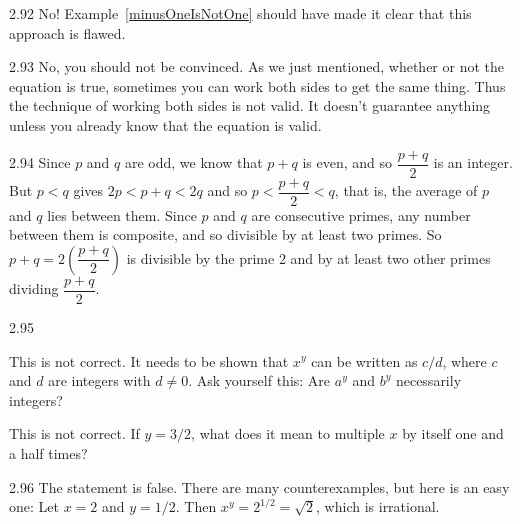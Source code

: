 \begin{Answer}{2.92}
No!  Example~\ref{minusOneIsNotOne} should have made it clear that this approach is flawed.
\end{Answer}
\begin{Answer}{2.93}
No, you should not be convinced.
As we just mentioned, whether or not the equation is true, sometimes you can work both
sides to get the same thing.  Thus the technique of working both sides is not valid.
It doesn't guarantee anything unless you already know that the equation is valid.
\end{Answer}
\begin{Answer}{2.94}
Since $p$ and $q$ are odd, we know that $p+q$ is even, and so
$\dfrac{p+q}{2}$ is an integer. But $p< q$ gives $2p < p+q < 2q $
and so $p < \dfrac{p+q}{2} < q$, that is, the average of $p$ and $q$
lies between them. Since $p$ and $q$ are consecutive primes, any
number between them is composite, and so divisible by at least two
primes. So $p+q = 2\left(\dfrac{p+q}{2}\right)$ is divisible by the
prime $2$ and by at least two other primes dividing
$\dfrac{p+q}{2}$.
\end{Answer}
\begin{Answer}{2.95}
\begin{pfevalenum}
\item
This is not correct.  It needs to be shown that $x^y$ can be written as $c/d$, where $c$ and $d$ are
integers with $d\neq 0$.  Ask yourself this:  Are $a^y$ and $b^y$ necessarily integers?
\item
This is not correct.  If $y=3/2$, what does it mean to multiple $x$ by itself one and a half times?
\end{pfevalenum}
\end{Answer}
\begin{Answer}{2.96}
The statement is false.  There are many counterexamples, but here is an easy one:
Let $x=2$ and $y=1/2$.  Then $x^y=2^{1/2}=\sqrt{2}$, which is irrational.
\end{Answer}
